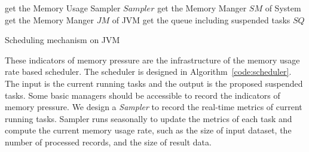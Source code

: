 \IncMargin{0.4em}
\SetAlFnt{\small}
\begin{algorithm}[!t]


get the Memory Usage Sampler $Sampler$\;
get the Memory Manger $SM$ of System\;
get the Memory Manger $JM$ of JVM\;
get the queue including suspended tasks $SQ$\;
\lElse{\CST}

\BlankLine
{}
\BlankLine
{}
\caption{Scheduling mechanism on JVM}
\label{code:scheduler}
\end{algorithm}

These indicators of memory pressure are the infrastructure of the memory usage rate based scheduler. The scheduler is designed in Algorithm~\ref{code:scheduler}. The input is the current running tasks and the output is the proposed suspended tasks. Some basic managers should be accessible to record the indicators of memory pressure. We design a \textit{Sampler} to record the real-time metrics of current running tasks. Sampler runs seasonally to update the metrics of each task and compute the current memory usage rate, such as the size of input dataset, the number of processed records, and the size of result data.

